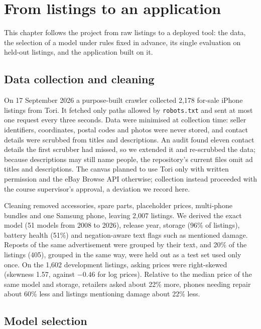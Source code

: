 \chapter{From listings to an application}
\label{chap:body}

This chapter follows the project from raw listings to a deployed tool: the data, the selection of a model under rules fixed in advance, its single evaluation on held-out listings, and the application built on it.

\section{Data collection and cleaning}

On 17 September 2026 a purpose-built crawler collected 2,178 for-sale iPhone listings from Tori. It fetched only paths allowed by \texttt{robots.txt} and sent at most one request every three seconds. Data were minimised at collection time: seller identifiers, coordinates, postal codes and photos were never stored, and contact details were scrubbed from titles and descriptions. An audit found eleven contact details the first scrubber had missed, so we extended it and re-scrubbed the data; because descriptions may still name people, the repository's current files omit ad titles and descriptions. The canvas planned to use Tori only with written permission and the eBay Browse API otherwise; collection instead proceeded with the course supervisor's approval, a deviation we record here.

Cleaning removed accessories, spare parts, placeholder prices, multi-phone bundles and one Samsung phone, leaving 2,007 listings. We derived the exact model (51 models from 2008 to 2026), release year, storage (96\% of listings), battery health (51\%) and negation-aware text flags such as mentioned damage. Reposts of the same advertisement were grouped by their text, and 20\% of the listings (405), grouped in the same way, were held out as a test set used only once. On the 1,602 development listings, asking prices were right-skewed (skewness 1.57, against $-0.46$ for log prices). Relative to the median price of the same model and storage, retailers asked about 22\% more, phones needing repair about 60\% less and listings mentioning damage about 22\% less.

\section{Model selection}

